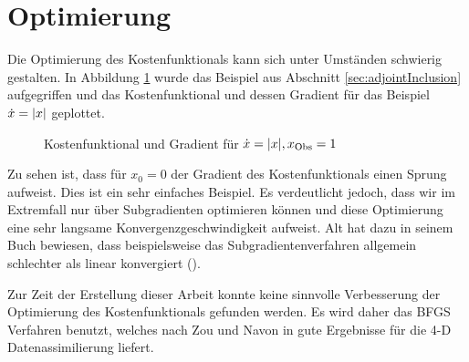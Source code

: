 \section{Optimierung}
Die Optimierung des Kostenfunktionals kann sich unter Umständen schwierig gestalten. In Abbildung \ref{fig:babyCostGrad} wurde das Beispiel aus Abschnitt \ref{sec:adjointInclusion} aufgegriffen und das Kostenfunktional und dessen Gradient für das Beispiel $\dot{x} = |x|$ geplottet. 
\begin{figure}[H]
\centering

\caption{Kostenfunktional und Gradient für $\dot{x} = |x|,x_{\text{Obs}}=1$}
\label{fig:babyCostGrad}
\end{figure}
Zu sehen ist, dass für $x_0=0$ der Gradient des Kostenfunktionals einen Sprung aufweist. Dies ist ein sehr einfaches Beispiel. Es verdeutlicht jedoch, dass wir im Extremfall nur über Subgradienten optimieren können und diese Optimierung eine sehr langsame Konvergenzgeschwindigkeit aufweist. Alt hat dazu in seinem Buch \cite{alt2004numerische} bewiesen, dass beispielsweise das Subgradientenverfahren allgemein schlechter als linear konvergiert (\cite[S.79]{alt2004numerische}).

Zur Zeit der Erstellung dieser Arbeit konnte keine sinnvolle Verbesserung der Optimierung des Kostenfunktionals gefunden werden. Es wird daher das BFGS Verfahren benutzt, welches nach Zou und Navon in \cite{zou1993numerical} gute Ergebnisse für die 4-D Datenassimilierung liefert. 
